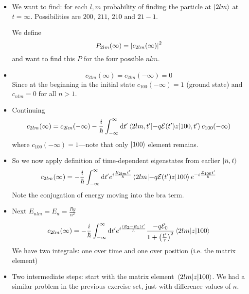\documentclass[11pt, a4paper]{article}
\newcommand{\diff}{\mathop{}\!\mathrm{d}} %
\newcommand{\E}{\mathcal{E}}  %
\begin{document}
	
\begin{itemize}
	\item We want to find: for each $ l, m $ probability of finding the particle at $ \ket{2lm} $ at $ t = \infty $. Possibilities are $ 200 $, $ 211 $, $ 210 $ and $ 21-1 $. 
	
	We define
	\begin{equation*}
		P_{2lm}(\infty) = \abs{c_{2lm}(\infty)}^{2}
	\end{equation*} 
	and want to find this $ P $ for the four possible $ nlm $.
	
	\item 
	\begin{equation*}
		c_{2lm}(\infty) = c_{2lm}(-\infty) = 0
	\end{equation*}
	Since at the beginning in the initial state $ c_{100}(-\infty) = 1 $ (ground state)  and $ c_{nlm} = 0 $ for all $ n > 1 $. 
	
	\item Continuing
	\begin{equation*}
		c_{2lm}(\infty) = c_{2lm}(-\infty) - \frac{i}{\hbar} \int_{-\infty}^{\infty} \diff t' \mel{2lm, t'}{-q\E(t')z}{100, t'}c_{100}(-\infty)
	\end{equation*}
	where $ c_{100}(-\infty) = 1 $---note that only $ \ket{100} $ element remains.
	
	\item So we now apply definition of time-dependent eigenstates from earlier $ \ket{n, t} $
	\begin{equation*}
		c_{2lm}(\infty) = - \frac{i}{\hbar} \int_{-\infty}^{\infty} \diff t'  e^{i\frac{E_{2lm}t'}{\hbar}} \mel{2lm}{-q\E(t')z}{100}e^{-i\frac{E_{100}t'}{\hbar}}
	\end{equation*}
	Note the conjugation of energy moving into the bra term.
	
	\item Next $ E_{nlm} = E_{n} = \frac{Ry}{n^{2}} $
	
	\begin{equation*}
		c_{2lm}(\infty) = - \frac{i}{\hbar} \int_{-\infty}^{\infty} \diff t'  e^{i\frac{(E_{2} - E_{1})t'}{\hbar}} \frac{-q \E_{0}}{1 + \left(\frac{t'}{\tau}\right)^{2}}\mel{2lm}{z}{100}
	\end{equation*}
	We have two integrals: one over time and one over position (i.e. the matrix element)
	
	\item Two intermediate steps: start with the matrix element $ \mel{2lm}{z}{100} $. We had a similar problem in the previous exercise set, just with difference values of $ n $. 
	

\end{itemize}
\end{document}
